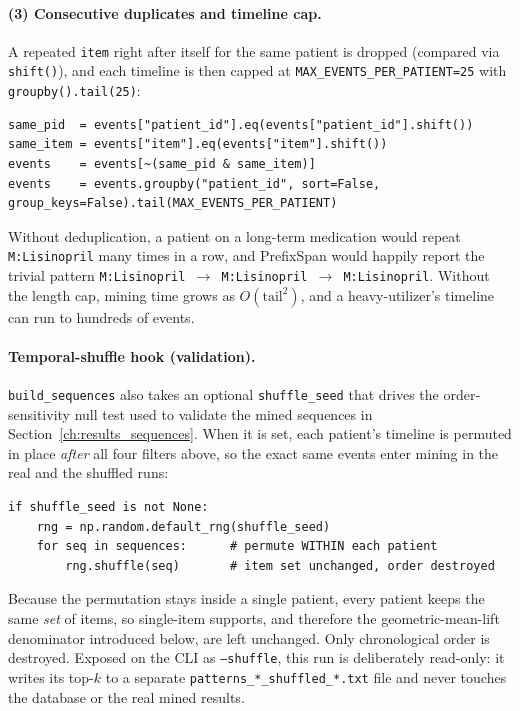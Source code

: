 \paragraph{(3) Consecutive duplicates and timeline cap.} A repeated \texttt{item} right after itself for the same patient is dropped (compared via \texttt{shift()}), and each timeline is then capped at \texttt{MAX\_EVENTS\_PER\_PATIENT=25} with \texttt{groupby().tail(25)}:

\vspace{0.25cm}

\begin{lstlisting}[style=pythonstyle]
same_pid  = events["patient_id"].eq(events["patient_id"].shift())
same_item = events["item"].eq(events["item"].shift())
events    = events[~(same_pid & same_item)]
events    = events.groupby("patient_id", sort=False, group_keys=False).tail(MAX_EVENTS_PER_PATIENT)
\end{lstlisting}

\noindent Without deduplication, a patient on a long-term medication would repeat \texttt{M:Lisinopril} many times in a row, and PrefixSpan would happily report the trivial pattern \texttt{M:Lisinopril \(\rightarrow\) M:Lisinopril \(\rightarrow\) M:Lisinopril}. Without the length cap, mining time grows as \(O(\text{tail}^2)\), and a heavy-utilizer's timeline can run to hundreds of events.

\paragraph{Temporal-shuffle hook (validation).} \texttt{build\_sequences} also takes an optional \texttt{shuffle\_seed} that drives the order-sensitivity null test used to validate the mined sequences in Section~\ref{ch:results_sequences}. When it is set, each patient's timeline is permuted in place \emph{after} all four filters above, so the exact same events enter mining in the real and the shuffled runs:

\vspace{0.25cm}

\begin{lstlisting}[style=pythonstyle]
if shuffle_seed is not None:
    rng = np.random.default_rng(shuffle_seed)
    for seq in sequences:      # permute WITHIN each patient
        rng.shuffle(seq)       # item set unchanged, order destroyed
\end{lstlisting}

\noindent Because the permutation stays inside a single patient, every patient keeps the same \emph{set} of items, so single-item supports, and therefore the geometric-mean-lift denominator introduced below, are left unchanged. Only chronological order is destroyed. Exposed on the CLI as \texttt{--shuffle}, this run is deliberately read-only: it writes its top-$k$ to a separate \texttt{patterns\_*\_shuffled\_*.txt} file and never touches the database or the real mined results.

